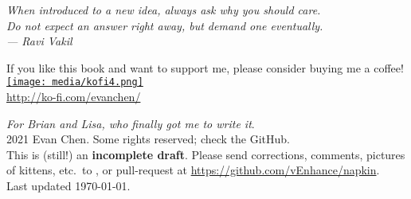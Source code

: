 \begin{titlepage}
	\vspace*{3cm}
	\begin{flushright}
		\large\itshape
		When introduced to a new idea, always ask why you should care. \\[0.2cm]
		Do not expect an answer right away, but demand one eventually. \\[0.8cm]
		--- Ravi Vakil \cite{ref:vakil}
	\end{flushright}

	\vspace*{8em}
	\hrulebar

	\begin{center}
	\begin{minipage}{50ex}
		\centering
		If you like this book and want to support me,
		please consider buying me a coffee! \\[2ex]
		\href{http://ko-fi.com/evanchen}{\texttt{[image: media/kofi4.png]}} \\
		\url{http://ko-fi.com/evanchen/}
	\end{minipage}
	\end{center}
	
	\vfill
	{
	\small
	\noindent \emph{For Brian and Lisa, who finally got me to write it}. \\[0.4cm]
	\noindent {\copyright} 2021 Evan Chen.
	Some rights reserved; check the GitHub. \\
	This is (still!) an \textbf{incomplete draft}.
	Please send corrections, comments, pictures of kittens,
	etc.\ to ,
	or pull-request at \url{https://github.com/vEnhance/napkin}.
	\\[0.4cm]
	\noindent Last updated \today.
	\vspace*{1cm}
	}
\end{titlepage}

